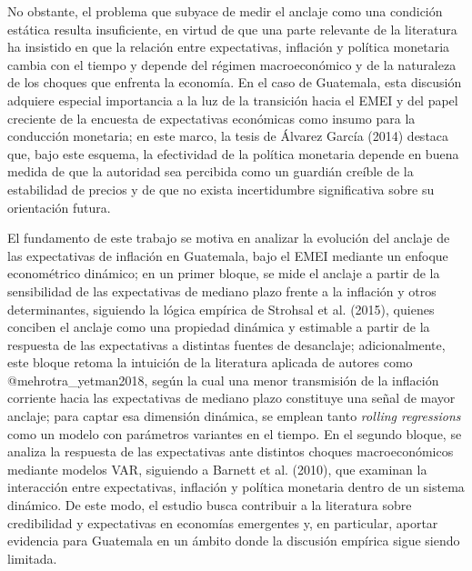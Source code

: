 \documentclass[
  10.5pt,
  letterpaper,
  twocolumn]{article}
\begin{document}
No obstante, el problema que subyace de medir el anclaje como una
condición estática resulta insuficiente, en virtud de que una parte
relevante de la literatura ha insistido en que la relación entre
expectativas, inflación y política monetaria cambia con el tiempo y
depende del régimen macroeconómico y de la naturaleza de los choques que
enfrenta la economía. En el caso de Guatemala, esta discusión adquiere
especial importancia a la luz de la transición hacia el EMEI y del papel
creciente de la encuesta de expectativas económicas como insumo para la
conducción monetaria; en este marco, la tesis de Álvarez García (2014)
destaca que, bajo este esquema, la efectividad de la política monetaria
depende en buena medida de que la autoridad sea percibida como un
guardián creíble de la estabilidad de precios y de que no exista
incertidumbre significativa sobre su orientación futura.

El fundamento de este trabajo se motiva en analizar la evolución del
anclaje de las expectativas de inflación en Guatemala, bajo el EMEI
mediante un enfoque econométrico dinámico; en un primer bloque, se mide
el anclaje a partir de la sensibilidad de las expectativas de mediano
plazo frente a la inflación y otros determinantes, siguiendo la lógica
empírica de Strohsal et al. (2015), quienes conciben el anclaje como una
propiedad dinámica y estimable a partir de la respuesta de las
expectativas a distintas fuentes de desanclaje; adicionalmente, este
bloque retoma la intuición de la literatura aplicada de autores como
@mehrotra\_yetman2018, según la cual una menor transmisión de la
inflación corriente hacia las expectativas de mediano plazo constituye
una señal de mayor anclaje; para captar esa dimensión dinámica, se
emplean tanto \emph{rolling regressions} como un modelo con parámetros
variantes en el tiempo. En el segundo bloque, se analiza la respuesta de
las expectativas ante distintos choques macroeconómicos mediante modelos
VAR, siguiendo a Barnett et al. (2010), que examinan la interacción
entre expectativas, inflación y política monetaria dentro de un sistema
dinámico. De este modo, el estudio busca contribuir a la literatura
sobre credibilidad y expectativas en economías emergentes y, en
particular, aportar evidencia para Guatemala en un ámbito donde la
discusión empírica sigue siendo limitada.
\end{document}
